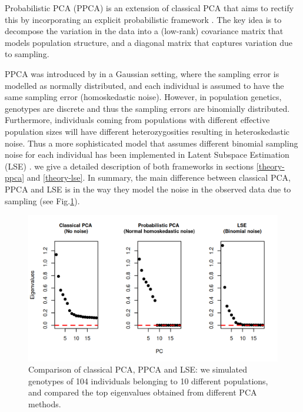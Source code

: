 \documentclass[12pt]{article}
\begin{document}
Probabilistic PCA (PPCA) is an extension of classical PCA that aims to rectify this by incorporating an explicit probabilistic framework \citep{tipping_probabilistic_1999-1}. The key idea is to decompose the variation in the data into a (low-rank) covariance matrix that models population structure, and a diagonal matrix that captures variation due to sampling.

PPCA was introduced by \citep{tipping_probabilistic_1999-1} in a Gaussian setting, where the sampling error is modelled as normally distributed, and each individual is assumed to have the same sampling error (homoskedastic noise). However, in population genetics, genotypes are discrete and thus the sampling errors are binomially distributed. Furthermore, individuals coming from populations with different effective population sizes will have different heterozygosities resulting in heteroskedastic noise. Thus a more sophisticated model that assumes different binomial sampling noise for each individual has been implemented in Latent Subspace Estimation (LSE) \citep{chen_consistent_2015, van_waaij_evaluation_2023, cabreros_likelihood-free_2019}. we give a detailed description of both frameworks in sections \ref{theory-ppca} and \ref{theory-lse}. In summary, the main difference between classical PCA, PPCA and LSE is in the way they model the noise in the observed data due to sampling (see Fig.\ref{fig1:pca_ppca}). 

\begin{figure}[ht!]
    \includegraphics[width=16.5cm]{Images/ppca/Figures/pca_all_genetic.png}
    \centering
    \caption{Comparison of classical PCA, PPCA and LSE: we simulated genotypes of 104 individuals belonging to 10 different populations, and compared the top eigenvalues obtained from different PCA methods.}
    \label{fig1:pca_ppca} 
\end{figure}
\end{document}
